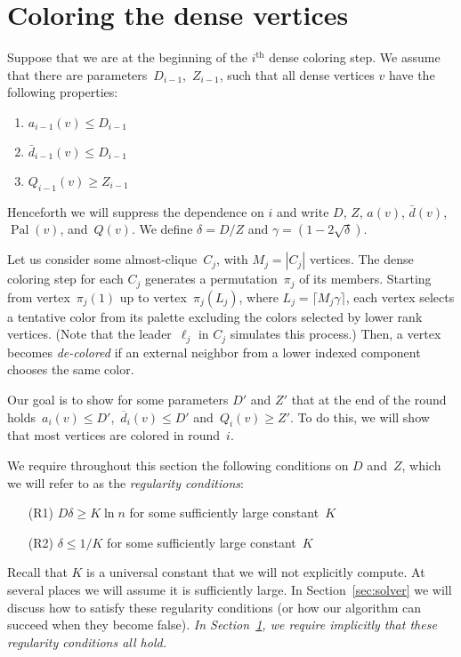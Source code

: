 \documentclass[11pt]{amsart}
\newcommand{\pal}{\operatorname{Pal}}
\newcommand{\extd}{\ensuremath{{\overline{d}}}}
\begin{document}
\section{Coloring the dense vertices}
\label{color-dense}
Suppose that we are at the beginning of the $i^{\text{th}}$ dense coloring step. We assume that there are parameters~$D_{i-1}$,~$Z_{i-1}$, such that all dense vertices $v$ have the following properties:
\begin{enumerate}
\item $a_{i-1}(v) \leq D_{i-1}$
\item ${\bar d}_{i-1}(v) \leq D_{i-1}$
\item $Q_{i-1}(v) \geq Z_{i-1}$
\end{enumerate}

Henceforth we will suppress the dependence on $i$ and write $D$, $Z$, $a(v)$, ${\bar d}(v)$, $\pal(v)$, and~$Q(v)$. We define $\delta = D/Z$ and $\gamma = (1 - 2 \sqrt{\delta})$.

Let us consider some almost-clique~$C_j$, with $M_j = |C_j|$ vertices. The dense coloring step for each $C_j$ generates a permutation~$\pi_j$ of its members. Starting from vertex~$\pi_j(1)$ up to vertex~$\pi_j(L_j)$, where $L_j = \lceil M_j \gamma \rceil$, each vertex selects a tentative color from its palette excluding the colors selected by lower rank vertices. (Note that the leader~$\ell_j$ in $C_j$ simulates this process.) Then, a vertex becomes \emph{de-colored} if an external neighbor from a lower indexed component chooses the same color.

Our goal is to show for some parameters $D'$ and $Z'$ that at the end of the round holds~$a_i(v) \leq D'$,~$\extd_i(v) \leq D'$ and~$Q_i(v) \geq Z'$. To do this, we will show that most vertices are colored in round~$i$.

We require throughout this section the following conditions on $D$ and~$Z$, which we will refer to as the \emph{regularity conditions}:
\begin{enumerate}
\item[(R1)] $D \delta \geq K \ln n$ for some sufficiently large constant~$K$
\item[(R2)] $\delta \leq 1/K$ for some sufficiently large constant~$K$
\end{enumerate}
Recall that $K$ is a universal constant that we will not explicitly compute. At several places we will assume it is sufficiently large. In Section~\ref{sec:solver} we will discuss how to satisfy these regularity conditions (or how our algorithm can succeed when they become false). \emph{In Section~\ref{color-dense}, we require implicitly that these regularity conditions all hold.} 
\end{document}
